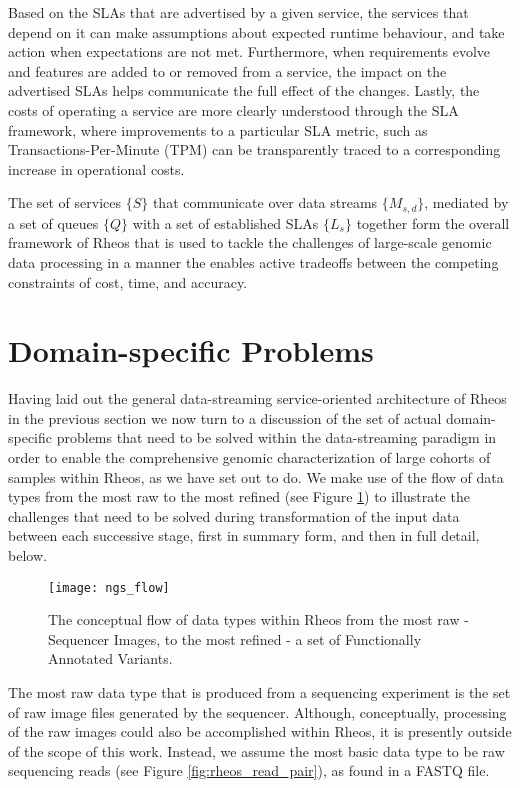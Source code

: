 Based on the SLAs that are advertised by a given service, the services that depend on it can make assumptions about expected runtime behaviour, and take action when expectations are not met. Furthermore, when requirements evolve and features are added to or removed from a service, the impact on the advertised SLAs helps communicate the full effect of the changes. Lastly, the costs of operating a service are more clearly understood through the SLA framework, where improvements to a particular SLA metric, such as Transactions-Per-Minute (TPM) can be transparently traced to a corresponding increase in operational costs.

The set of services $\{S\}$ that communicate over data streams $\{M_{s,d}\}$, mediated by a set of queues $\{Q\}$ with a set of established SLAs $\{L_s\}$ together form the overall framework of Rheos that is used to tackle the challenges of large-scale genomic data processing in a manner the enables active tradeoffs between the competing constraints of cost, time, and accuracy. 

\section{Domain-specific Problems}\label{sec:rheos_domain_specific_problems}

Having laid out the general data-streaming service-oriented architecture of Rheos in the previous section we now turn to a discussion of the set of actual domain-specific problems that need to be solved within the data-streaming paradigm in order to enable the comprehensive genomic characterization of large cohorts of samples within Rheos, as we have set out to do. We make use of the flow of data types from the most raw to the most refined (see Figure \ref{fig:ngs_flow}) to illustrate the challenges that need to be solved during transformation of the input data between each successive stage, first in summary form, and then in full detail, below.

\begin{figure}[h!]
\texttt{[image: ngs\_flow]}
\centering
\caption {The conceptual flow of data types within Rheos from the most raw - Sequencer Images, to the most refined - a set of Functionally Annotated Variants.}
\label{fig:ngs_flow}
\end{figure}
    
The most raw data type that is produced from a sequencing experiment is the set of raw image files generated by the sequencer. Although, conceptually, processing of the raw images could also be accomplished within Rheos, it is presently outside of the scope of this work. Instead, we assume the most basic data type to be raw sequencing reads (see Figure \ref{fig:rheos_read_pair}), as found in a FASTQ\autocite{cock2009sanger} file. 

